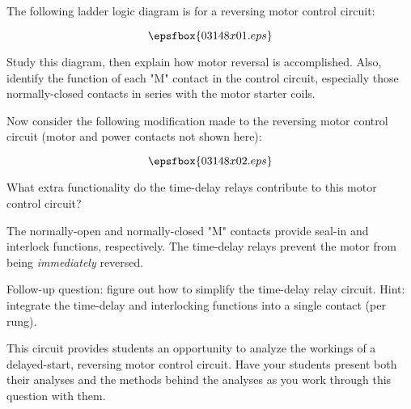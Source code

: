 

The following ladder logic diagram is for a reversing motor control circuit:

$$\epsfbox{03148x01.eps}$$

Study this diagram, then explain how motor reversal is accomplished.  Also, identify the function of each "M" contact in the control circuit, especially those normally-closed contacts in series with the motor starter coils.

\vskip 10pt

\goodbreak

Now consider the following modification made to the reversing motor control circuit (motor and power contacts not shown here):

$$\epsfbox{03148x02.eps}$$

What extra functionality do the time-delay relays contribute to this motor control circuit?







The normally-open and normally-closed "M" contacts provide seal-in and interlock functions, respectively.  The time-delay relays prevent the motor from being {\it immediately} reversed.

\vskip 10pt

Follow-up question: figure out how to simplify the time-delay relay circuit.  Hint: integrate the time-delay and interlocking functions into a single contact (per rung).







This circuit provides students an opportunity to analyze the workings of a delayed-start, reversing motor control circuit.  Have your students present both their analyses and the methods behind the analyses as you work through this question with them.




